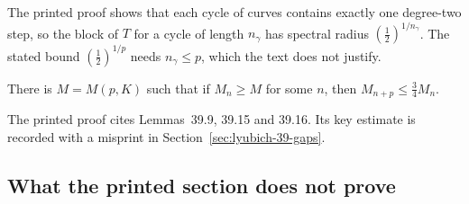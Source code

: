 The printed proof shows that each cycle of curves contains exactly one degree-two step, so the block of $T$ for a
cycle of length $n_\gamma$ has spectral radius $(\tfrac12)^{1/n_\gamma}$.  The stated bound $(\tfrac12)^{1/p}$ needs
$n_\gamma\le p$, which the text does not justify.

\begin{lemma}
\label{lem:lyubich-39-17}
There is $M=M(p,K)$ such that if $M_n\ge M$ for some $n$, then $M_{n+p}\le\tfrac34M_n$.
\end{lemma}

The printed proof cites Lemmas~39.9, 39.15 and 39.16.  Its key estimate is recorded with a misprint in
Section~\ref{sec:lyubich-39-gaps}.

\subsection*{What the printed section does not prove}
\label{sec:lyubich-39-gaps}

